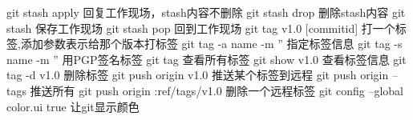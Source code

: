 git stash apply            回复工作现场，stash内容不删除
git stash drop             删除stash内容
git stash                  保存工作现场
git stash pop              回到工作现场
git tag v1.0 [commitid]    打一个标签,添加参数表示给那个版本打标签
git tag -a name -m ''      指定标签信息
git tag -s name -m ''      用PGP签名标签
git tag                    查看所有标签
git show v1.0              查看标签信息
git tag -d v1.0            删除标签
git push origin v1.0       推送某个标签到远程
git push origin --tags     推送所有
git push origin :ref/tags/v1.0 删除一个远程标签
git config --global color.ui true 让git显示颜色















